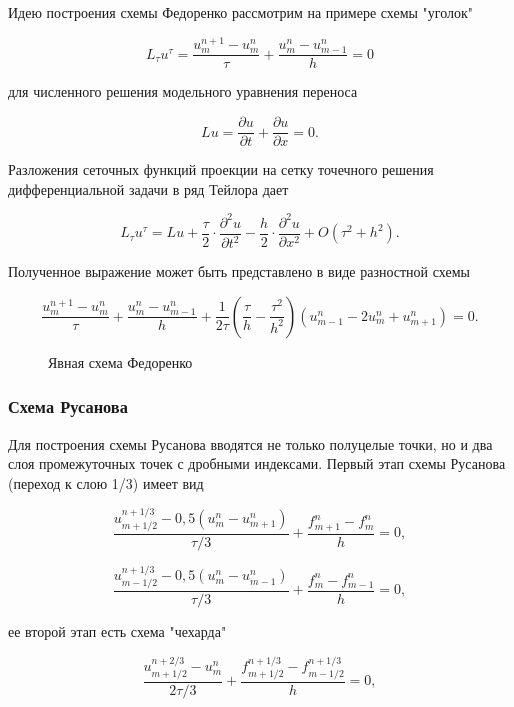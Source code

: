 \documentclass{article}
\begin{document}
\indent
Идею построения схемы Федоренко рассмотрим на примере схемы "уголок"

$$L_{\tau}u^{\tau} = \frac{u^{n+1}_{m} - u^{n}_{m}}{\tau} + \frac{u^{n}_{m} - u^{n}_{m-1}}{h} = 0$$

для численного решения модельного уравнения переноса

$$Lu = \frac{\partial u}{\partial t} + \frac{\partial u}{\partial x} = 0.$$

\indent
Разложения сеточных функций проекции на сетку точечного решения дифференциальной задачи в ряд Тейлора дает

$$L_{\tau}u^{\tau} = Lu + \frac{\tau}{2}\cdot \frac{\partial^2 u}{\partial t^2} - \frac{h}{2}\cdot \frac{\partial^2 u}{\partial x^2} + O(\tau^2 + h^2).$$

Полученное выражение может быть представлено в виде разностной схемы

$$\frac{u^{n+1}_{m} - u^{n}_{m}}{\tau} + \frac{u^{n}_{m} - u^{n}_{m-1}}{h} + \frac{1}{2\tau}(\frac{\tau}{h} - \frac{\tau^2}{h^2})(u^n_{m-1} -2u^n_m + u^n_{m+1}) = 0.$$

\begin{figure}[h]
\caption{Явная схема Федоренко}
\label{ris:image}
\end{figure}  

\subsubsection{Схема Русанова}

\indent
Для построения схемы Русанова вводятся не только полуцелые точки, но и два слоя промежуточных точек с дробными индексами. Первый этап схемы Русанова (переход к слою 1/3) имеет вид

$$\frac{u^{n+1/3}_{m+1/2}-0,5(u^n_m - u^n_{m+1})}{\tau/3} + \frac{f^n_{m+1}-f^n_m}{h} = 0,$$

$$\frac{u^{n+1/3}_{m-1/2}-0,5(u^n_m - u^n_{m-1})}{\tau/3} + \frac{f^n_m-f^n_{m-1}}{h} = 0,$$

ее второй этап есть схема "чехарда"

$$\frac{u^{n+2/3}_{m+1/2}-u^n_m}{2\tau/3} + \frac{f^{n+1/3}_{m+1/2}-f^{n+1/3}_{m-1/2}}{h} = 0,$$
\end{document}
